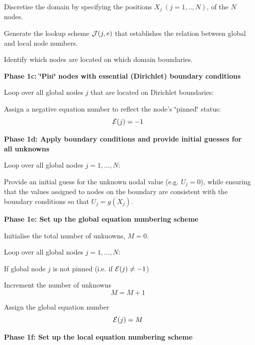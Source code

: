 \begin{DoxyItemize}
\item Discretise the domain by specifying the positions $ X_j \ (j=1,..,N)$, of the $ N $ nodes.
\item Generate the lookup scheme $ {\cal J}(j,e)$ that establishes the relation between global and local node numbers.
\item Identify which nodes are located on which domain boundaries.

{\bfseries  Phase 1c\-: \char`\"{}\-Pin\char`\"{} nodes with essential (Dirichlet) boundary conditions }
\item Loop over all global nodes $ j $ that are located on Dirichlet boundaries\-:
\begin{DoxyItemize}
\item Assign a negative equation number to reflect the node's \char`\"{}pinned\char`\"{} status\-: \[ {\cal E}(j) = -1 \]
\end{DoxyItemize}

{\bfseries  Phase 1d\-: Apply boundary conditions and provide initial guesses for all unknowns}
\item Loop over all global nodes $j=1,...,N$\-:
\begin{DoxyItemize}
\item Provide an initial guess for the unknown nodal value (e.\-g. $ U_j=0 $), while ensuring that the values assigned to nodes on the boundary are consistent with the boundary conditions so that $ U_j = g(X_j). $
\end{DoxyItemize}

{\bfseries  Phase 1e\-: Set up the global equation numbering scheme}
\end{DoxyItemize}


\begin{DoxyItemize}
\item Initialise the total number of unknowns, $M=0.$
\item Loop over all global nodes $j=1,...,N$\-:
\begin{DoxyItemize}
\item If global node $ j $ is not pinned (i.\-e. if $ {\cal E}(j) \ne -1 $)
\begin{DoxyItemize}
\item Increment the number of unknowns \[ M=M+1 \]
\item Assign the global equation number \[ {\cal E}(j) = M \]
\end{DoxyItemize}
\end{DoxyItemize}

{\bfseries  Phase 1f\-: Set up the local equation numbering scheme}
\end{DoxyItemize}


